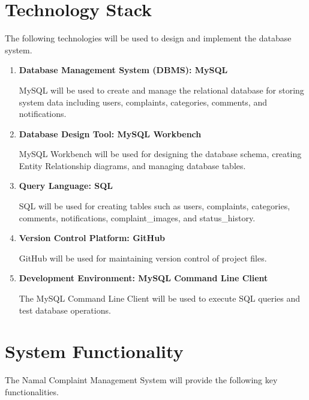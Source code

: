 \documentclass[12pt,a4paper]{article}
\begin{document}

\section{Technology Stack}

The following technologies will be used to design and implement the database system.

\begin{enumerate}

\item \textbf{Database Management System (DBMS): MySQL}

MySQL will be used to create and manage the relational database for storing system data including users, complaints, categories, comments, and notifications.

\item \textbf{Database Design Tool: MySQL Workbench}

MySQL Workbench will be used for designing the database schema, creating Entity Relationship diagrams, and managing database tables.

\item \textbf{Query Language: SQL}

SQL will be used for creating tables such as users, complaints, categories, comments, notifications, complaint\_images, and status\_history.

\item \textbf{Version Control Platform: GitHub}

GitHub will be used for maintaining version control of project files.

\item \textbf{Development Environment: MySQL Command Line Client}

The MySQL Command Line Client will be used to execute SQL queries and test database operations.

\end{enumerate}


\section{System Functionality}

The Namal Complaint Management System will provide the following key functionalities.
\end{document}
